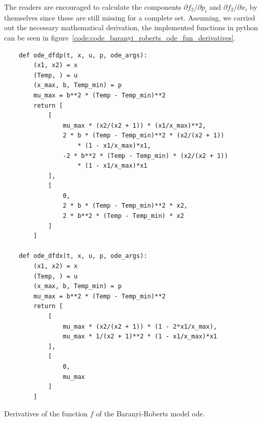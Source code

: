 \documentclass[10pt,A4paper]{article}
\begin{document}
The readers are encouraged to calculate the components $\partial f_2/\partial p_i$ and $\partial f_2/\partial x_i$ by themselves since these are still missing for a complete set.
Assuming, we carried out the necessary mathematical derivation, the implemented functions in python can be seen in figure~\ref{code:code_baranyi_roberts_ode_fun_derivatives}.
\begin{code}[H]
    \begin{verbatim}
    def ode_dfdp(t, x, u, p, ode_args):
        (x1, x2) = x
        (Temp, ) = u
        (x_max, b, Temp_min) = p
        mu_max = b**2 * (Temp - Temp_min)**2
        return [
            [
                mu_max * (x2/(x2 + 1)) * (x1/x_max)**2,
                2 * b * (Temp - Temp_min)**2 * (x2/(x2 + 1))
                    * (1 - x1/x_max)*x1,
                -2 * b**2 * (Temp - Temp_min) * (x2/(x2 + 1))
                    * (1 - x1/x_max)*x1
            ],
            [
                0,
                2 * b * (Temp - Temp_min)**2 * x2,
                2 * b**2 * (Temp - Temp_min) * x2
            ] 
        ]

    def ode_dfdx(t, x, u, p, ode_args):
        (x1, x2) = x
        (Temp, ) = u
        (x_max, b, Temp_min) = p
        mu_max = b**2 * (Temp - Temp_min)**2
        return [
            [
                mu_max * (x2/(x2 + 1)) * (1 - 2*x1/x_max),
                mu_max * 1/(x2 + 1)**2 * (1 - x1/x_max)*x1
            ], 
            [
                0,
                mu_max
            ]
        ]
    \end{verbatim}
    \caption{Derivatives of the function $f$ of the Baranyi-Roberts model \ac{ode}.}
    \label{code:code_baranyi_roberts_ode_fun_derivatives}
\end{code}
%
\end{document}
